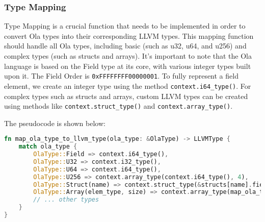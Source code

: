\subsubsection*{Type Mapping}

Type Mapping is a crucial function that needs to be implemented in order to convert Ola types into their corresponding LLVM types. This mapping function should handle all Ola types, including basic (such as u32, u64, and u256) and complex types (such as structs and arrays). It's important to note that the Ola language is based on the Field type at its core, with various integer types built upon it. The Field Order is \texttt{0xFFFFFFFF00000001}. To fully represent a field element, we create an integer type using the method \texttt{context.i64\_type()}. For complex types such as structs and arrays, custom LLVM types can be created using methods like \texttt{context.struct\_type()} and \texttt{context.array\_type()}.

The pseudocode is shown below:

\begin{lstlisting}[language=Rust]
fn map_ola_type_to_llvm_type(ola_type: &OlaType) -> LLVMType {
    match ola_type {
        OlaType::Field => context.i64_type(),
        OlaType::U32 => context.i32_type(),
        OlaType::U64 => context.i64_type(),
        OlaType::U256 => context.array_type(context.i64_type(), 4),
        OlaType::Struct(name) => context.struct_type(&structs[name].fields, false),
        OlaType::Array(elem_type, size) => context.array_type(map_ola_type_to_llvm_type(elem_type), *size),
        // ... other types
    }
}
\end{lstlisting}
